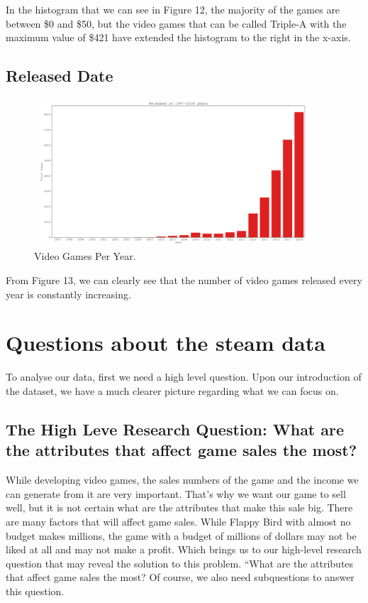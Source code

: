 \documentclass[conference]{IEEEtran}
\begin{document}
In the histogram that we can see in Figure 12, the majority of the games are between \$0 and \$50, but the video games that can be called Triple-A with the maximum value of \$421 have extended the histogram to the right in the x-axis.

\subsection{Released Date}


\begin{figure}[h]
  \includegraphics[width=\linewidth, height=5.5cm]{assets/released_date_bar.png}
  \caption{Video Games Per Year.}
  \label{fig:releaseddate1}
\end{figure}

From Figure 13, we can clearly see that the number of video games released every year is constantly increasing.

\section{Questions about the steam data}
To analyse our data, first we need a high level question. Upon our introduction of the dataset, we have a much clearer picture regarding what we can focus on.

\subsection{The High Leve Research Question: What are the attributes that affect game sales the most?}\label{AA}
While developing video games, the sales numbers of the game and the income we can generate from it are very important. That's why we want our game to sell well, but it is not certain what are the attributes that make this sale big. There are many factors that will affect game sales. While Flappy Bird with almost no budget makes millions, the game with a budget of millions of dollars may not be liked at all and may not make a profit. Which brings us to our high-level research question that may reveal the solution to this problem. “What are the attributes that affect game sales the most? Of course, we also need subquestions to answer this question.
\end{document}
